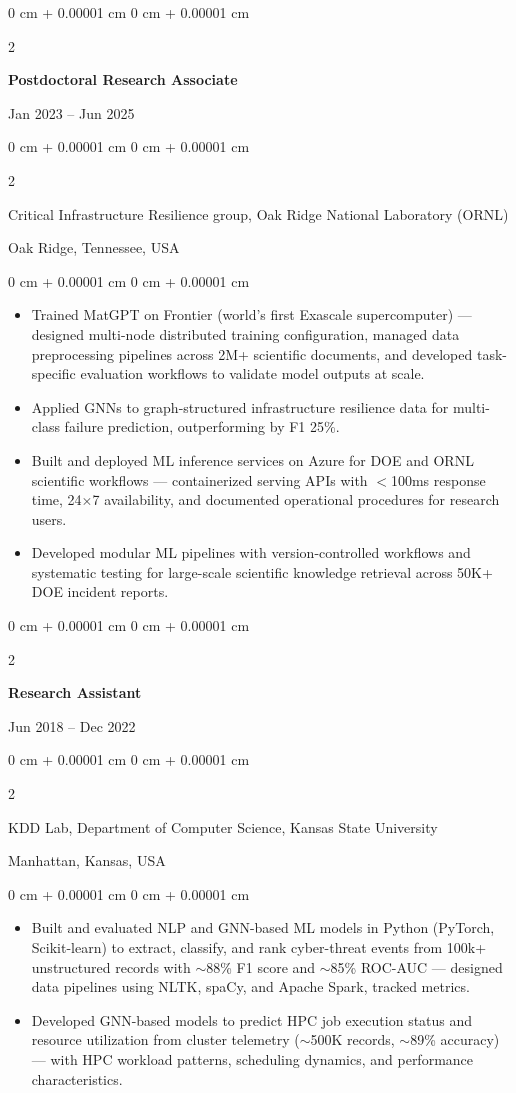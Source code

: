 \documentclass[10pt, letterpaper]{article}
\newenvironment{highlights}{
    \begin{itemize}[
        topsep=0.10 cm,
        parsep=0.10 cm,
        partopsep=0pt,
        itemsep=0pt,
        leftmargin=0 cm + 10pt
    ]
}{
    \end{itemize}
} %
\newenvironment{onecolentry}{
    \begin{adjustwidth}{
        0 cm + 0.00001 cm
    }{
        0 cm + 0.00001 cm
    }
}{
    \end{adjustwidth}
} %
\newenvironment{twocolentry}[2][]{
    \onecolentry
    \def\secondColumn{#2}
    \setcolumnwidth{\fill, 4.5 cm}
    \begin{paracol}{2}
}{
    \switchcolumn \raggedleft \secondColumn
    \end{paracol}
    \endonecolentry
} %
\begin{document}
    \begin{twocolentry}{Jan 2023 -- Jun 2025}
        \textbf{Postdoctoral Research Associate}
    \end{twocolentry}
    \begin{twocolentry}{Oak Ridge, Tennessee, USA}
        Critical Infrastructure Resilience group, Oak Ridge National Laboratory (ORNL)
    \end{twocolentry}
    \vspace{0.10 cm}
    \begin{onecolentry}
        \begin{highlights}
            \item Trained MatGPT on Frontier (world’s first Exascale supercomputer) — designed multi-node distributed training configuration, managed data preprocessing pipelines across 2M+ scientific documents, and developed task-specific evaluation workflows to validate model outputs at scale.
            \item Applied GNNs to graph-structured infrastructure resilience data for multi-class failure prediction, outperforming by F1 25\%.
            \item Built and deployed ML inference services on Azure for DOE and ORNL scientific workflows — containerized serving APIs with $<$100ms response time, 24$\times$7 availability, and documented operational procedures for research users.
            \item Developed modular ML pipelines with version-controlled workflows and systematic testing for large-scale scientific knowledge retrieval across 50K+ DOE incident reports.
        \end{highlights}
    \end{onecolentry}

    \vspace{1mm}

    \begin{twocolentry}{Jun 2018 -- Dec 2022}
        \textbf{Research Assistant}
    \end{twocolentry}
    \begin{twocolentry}{Manhattan, Kansas, USA}
       KDD Lab, Department of Computer Science, Kansas State University
    \end{twocolentry}
    \vspace{0.10 cm}
    \begin{onecolentry}
        \begin{highlights}
            \item Built and evaluated NLP and GNN-based ML models in Python (PyTorch, Scikit-learn) to extract, classify, and rank cyber-threat events from 100k+ unstructured records with $\sim$88\% F1 score and $\sim$85\% ROC-AUC — designed data pipelines using NLTK, spaCy, and Apache Spark, tracked metrics.
            \item Developed GNN-based models to predict HPC job execution status and resource utilization from cluster telemetry ($\sim$500K records, $\sim$89\% accuracy) — with HPC workload patterns, scheduling dynamics, and performance characteristics.
        \end{highlights}
    \end{onecolentry}
\end{document}
